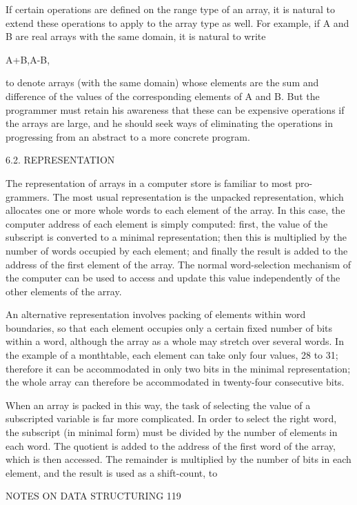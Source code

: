 {{{			If certain operations are defined on the range type of an array, it is natural to extend these operations to apply to the array type as well. For example, if A and B are real arrays with the same domain, it is natural to write
			
			A+B,A-B,
			
			to denote arrays (with the same domain) whose elements are the sum and difference of the values of the corresponding elements of A and B. But the programmer must retain his awareness that these can be expensive operations if the arrays are large, and he should seek ways of eliminating the operations in progressing from an abstract to a more concrete program.
			
			6.2. REPRESENTATION
			
			The representation of arrays in a computer store is familiar to most pro- grammers. The most usual representation is the unpacked representation, which allocates one or more whole words to each element of the array. In this case, the computer address of each element is simply computed: first, the value of the subscript is converted to a minimal representation; then this is multiplied by the number of words occupied by each element; and finally the result is added to the address of the first element of the array. The normal word-selection mechanism of the computer can be used to access and update this value independently of the other elements of the array.
			
			An alternative representation involves packing of elements within word boundaries, so that each element occupies only a certain fixed number of bits within a word, although the array as a whole may stretch over several words. In the example of a monthtable, each element can take only four values, 28 to 31; therefore it can be accommodated in only two bits in the minimal representation; the whole array can therefore be accommodated in twenty-four consecutive bits.
			
			When an array is packed in this way, the task of selecting the value of a subscripted variable is far more complicated. In order to select the right word, the subscript (in minimal form) must be divided by the number of elements in each word. The quotient is added to the address of the first word of the array, which is then accessed. The remainder is multiplied by the number of bits in each element, and the result is used as a shift-count, to
			
			NOTES ON DATA STRUCTURING 119
			
}}}

